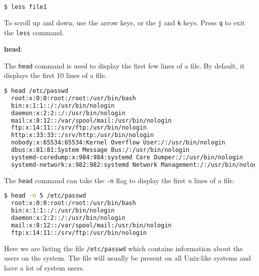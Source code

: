 \begin{lstlisting}[language=bash]
  $ less file1
\end{lstlisting}

To scroll up and down, use the arrow keys, or the \lstinline|j| and \lstinline|k| keys.
Press \lstinline|q| to exit the \lstinline|less| command.

\textbf{head}:

The \lstinline|head| command is used to display the first few lines of a file.
By default, it displays the first 10 lines of a file.

\begin{lstlisting}[language=bash]
  $ head /etc/passwd
  root:x:0:0:root:/root:/usr/bin/bash
  bin:x:1:1::/:/usr/bin/nologin
  daemon:x:2:2::/:/usr/bin/nologin
  mail:x:8:12::/var/spool/mail:/usr/bin/nologin
  ftp:x:14:11::/srv/ftp:/usr/bin/nologin
  http:x:33:33::/srv/http:/usr/bin/nologin
  nobody:x:65534:65534:Kernel Overflow User:/:/usr/bin/nologin
  dbus:x:81:81:System Message Bus:/:/usr/bin/nologin
  systemd-coredump:x:984:984:systemd Core Dumper:/:/usr/bin/nologin
  systemd-network:x:982:982:systemd Network Management:/:/usr/bin/nologin
\end{lstlisting}

The \lstinline|head| command can take the \lstinline|-n| flag to display the first \textit{n} lines of a file.

\begin{lstlisting}[language=bash]
  $ head -n 5 /etc/passwd
  root:x:0:0:root:/root:/usr/bin/bash
  bin:x:1:1::/:/usr/bin/nologin
  daemon:x:2:2::/:/usr/bin/nologin
  mail:x:8:12::/var/spool/mail:/usr/bin/nologin
  ftp:x:14:11::/srv/ftp:/usr/bin/nologin
\end{lstlisting}

\begin{remark}
  Here we are listing the file \lstinline|/etc/passwd| which contains information about the users on the system.
  The file will usually be present on all Unix-like systems and have a lot of system users.
\end{remark}

